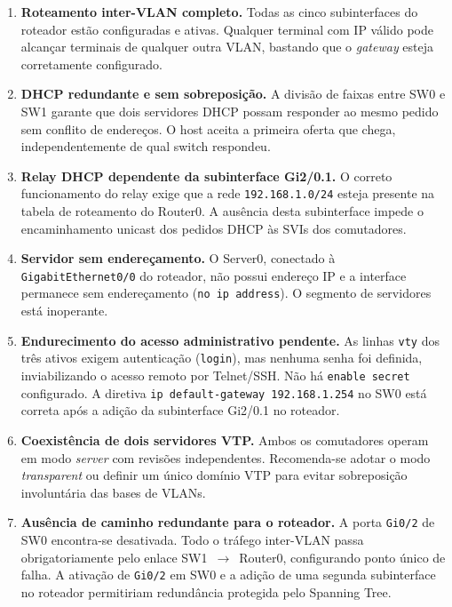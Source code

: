 \documentclass[12pt,a4paper]{article}
\begin{document}
\begin{enumerate}[leftmargin=2em]
  \item \textbf{Roteamento inter-VLAN completo.} Todas as cinco subinterfaces
        do roteador estão configuradas e ativas. Qualquer terminal com IP válido
        pode alcançar terminais de qualquer outra VLAN, bastando que o \textit{gateway}
        esteja corretamente configurado.

  \item \textbf{DHCP redundante e sem sobreposição.} A divisão de faixas entre SW0
        e SW1 garante que dois servidores DHCP possam responder ao mesmo pedido sem
        conflito de endereços. O host aceita a primeira oferta que chega,
        independentemente de qual switch respondeu.

  \item \textbf{Relay DHCP dependente da subinterface Gi2/0.1.} O correto
        funcionamento do relay exige que a rede \texttt{192.168.1.0/24} esteja
        presente na tabela de roteamento do Router0. A ausência desta subinterface
        impede o encaminhamento unicast dos pedidos DHCP às SVIs dos comutadores.

  \item \textbf{Servidor sem endereçamento.} O Server0, conectado à
        \texttt{GigabitEthernet0/0} do roteador, não possui endereço IP
        e a interface permanece sem endereçamento (\texttt{no ip address}).
        O segmento de servidores está inoperante.

  \item \textbf{Endurecimento do acesso administrativo pendente.} As linhas
        \texttt{vty} dos três ativos exigem autenticação (\texttt{login}), mas
        nenhuma senha foi definida, inviabilizando o acesso remoto por Telnet/SSH.
        Não há \texttt{enable secret} configurado. A diretiva
        \texttt{ip default-gateway 192.168.1.254} no SW0 está correta após a
        adição da subinterface Gi2/0.1 no roteador.

  \item \textbf{Coexistência de dois servidores VTP.} Ambos os comutadores operam
        em modo \textit{server} com revisões independentes. Recomenda-se adotar
        o modo \textit{transparent} ou definir um único domínio VTP para evitar
        sobreposição involuntária das bases de VLANs.

  \item \textbf{Ausência de caminho redundante para o roteador.} A porta
        \texttt{Gi0/2} de SW0 encontra-se desativada. Todo o tráfego inter-VLAN
        passa obrigatoriamente pelo enlace SW1~$\rightarrow$~Router0, configurando
        ponto único de falha. A ativação de \texttt{Gi0/2} em SW0 e a adição de
        uma segunda subinterface no roteador permitiriam redundância protegida
        pelo Spanning Tree.
\end{enumerate}
\end{document}
